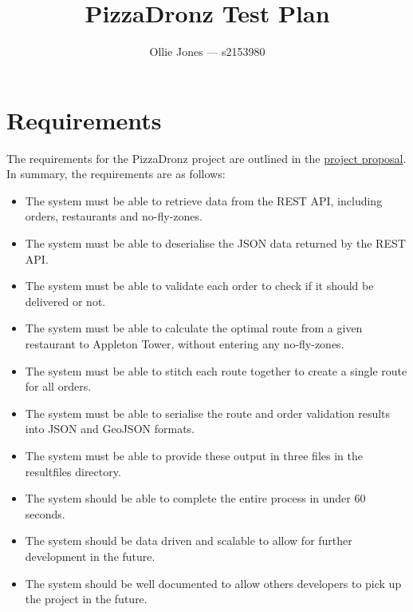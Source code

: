 \documentclass[11pt, a4paper]{article}
\title{PizzaDronz Test Plan}
\author{Ollie Jones — s2153980}
\date{}
\newcommand{\baseURL}{https://github.com/oathompsonjones/PizzaDronz}
\begin{document}
\maketitle

\section{Requirements}
    The requirements for the PizzaDronz project are outlined in the \href{\baseURL/blob/main/Project%20Proposal.pdf}{project proposal}.
    In summary, the requirements are as follows:
    \begin{itemize}
        \item The system must be able to retrieve data from the REST API, including orders, restaurants and no-fly-zones.
        \item The system must be able to deserialise the JSON data returned by the REST API.
        \item The system must be able to validate each order to check if it should be delivered or not.
        \item The system must be able to calculate the optimal route from a given restaurant to Appleton Tower, without entering any no-fly-zones.
        \item The system must be able to stitch each route together to create a single route for all orders.
        \item The system must be able to serialise the route and order validation results into JSON and GeoJSON formats.
        \item The system must be able to provide these output in three files in the resultfiles directory.
        \item The system should be able to complete the entire process in under 60 seconds.
        \item The system should be data driven and scalable to allow for further development in the future.
        \item The system should be well documented to allow others developers to pick up the project in the future.
    \end{itemize}
\end{document}
